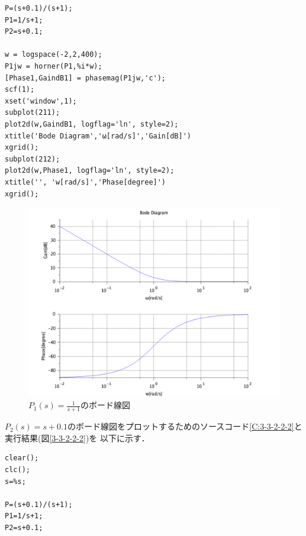 \documentclass[a4paper,11pt]{jsarticle}
\begin{document}
\begin{enumerate}
\begin{lstlisting}[caption=図\ref{3-3-2-2-1}をプロットするコード, label=C:3-3-2-2-1]
P=(s+0.1)/(s+1);
P1=1/s+1;
P2=s+0.1;

w = logspace(-2,2,400);
P1jw = horner(P1,%i*w);
[Phase1,GaindB1] = phasemag(P1jw,'c');
scf(1);
xset('window',1);
subplot(211);
plot2d(w,GaindB1, logflag='ln', style=2);
xtitle('Bode Diagram','ω[rad/s]','Gain[dB]')
xgrid();
subplot(212);
plot2d(w,Phase1, logflag='ln', style=2);
xtitle('', 'w[rad/s]','Phase[degree]')
xgrid();
      \end{lstlisting}
        \begin{figure}[H]
          \centering
          \includegraphics[width=0.8\linewidth]{picture/kadai7-2.png}
          \caption{$P_1(s)=\frac{1}{s+1}$のボード線図}
          \label{3-3-2-2-1}
        \end{figure}
        $P_2(s)=s+0.1$のボード線図をプロットするためのソースコード\ref{C:3-3-2-2-2}と実行結果(図\ref{3-3-2-2-2})を
        以下に示す．
        \begin{lstlisting}[caption=図\ref{3-3-2-2-2}をプロットするコード, label=C:3-3-2-2-2]
clear();
clc();
s=%s;

P=(s+0.1)/(s+1);
P1=1/s+1;
P2=s+0.1;


\end{lstlisting}
\end{enumerate}
\end{document}
